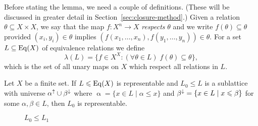 
Before stating the lemma, we need a couple of definitions.  (These will be
discussed in greater detail in Section~\ref{sec:closure-method}.)
Given a relation $\theta \subseteq X\times X$, we say that the map 
$f: X^n\rightarrow X$ \emph{respects} $\theta$ and we write 
$f(\theta) \subseteq \theta$ provided $(x_i, y_i)\in \theta$ implies
$(f(x_1, \dots, x_n), f(y_1, \dots, y_n))\in \theta$.
For a set $L\subseteq \operatorname{Eq}(X)$ of equivalence relations we define
\[
\lambda(L) = \{f\in X^X: (\forall \theta \in L) \; f(\theta) \subseteq \theta \},
\]
which is the set of all unary maps on $X$ which respect all relations in $L$.
\begin{lemma} 
  \label{lemma:union-filter-ideal}
  Let $X$ be a finite set.
  If $L \leqslant \operatorname{Eq}(X)$ is representable and $L_0\leq L$ is a sublattice with universe
  $\alpha^{\uparrow}\cup \beta^{\downarrow}$ where $\upalpha=\{x\in L \mid \alpha \leq x\}$ and 
  $\beta^{\downarrow}=\{x\in L \mid x\leqslant \beta\}$ for some $\alpha, \beta \in L$, then $L_0$ is representable.
\end{lemma}

\vskip3mm

\begin{figure}[htp]
\begin{center}
\end{center}
\caption{$L_0 \le L_1$}
\end{figure}

\vskip3mm

